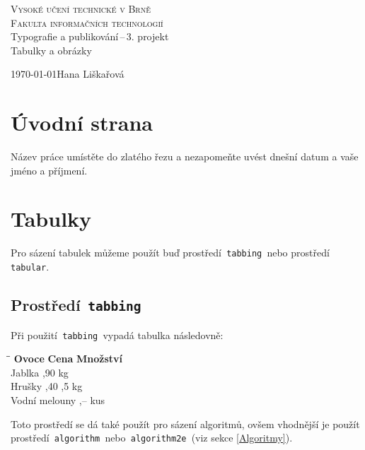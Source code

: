 \documentclass[a4paper, 11pt]{article}
\begin{document}
\begin{titlepage}
    \begin{center}
            \Huge{\textsc{Vysoké učení technické v Brně}}\\ %
            \huge{\textsc{Fakulta informačních technologií}}\\
        
        \LARGE{Typografie a publikování\,--\,3. projekt}\\
        \Huge{Tabulky a obrázky}
    \end{center}
    {\Large{\today \hfill Hana Liškařová}}
\end{titlepage}

\section{Úvodní strana}
    Název práce umístěte do zlatého řezu a nezapomeňte uvést dnešní datum a vaše jméno a příjmení.

\section{Tabulky}
    Pro sázení tabulek můžeme použít buď prostředí\texttt{ tabbing }nebo prostředí\texttt{ tabular}. %

    \subsection{Prostředí\texttt{ tabbing}}
        Při použití\texttt{ tabbing }vypadá tabulka následovně: %
        \begin{tabbing}
            \qquad\qquad\qquad\quad  \=   \qquad\qquad  \= \kill
            \textbf{Ovoce}\> \textbf{Cena}  \> \textbf{Množství}\\
            Jablka        ,90           kg\\
            Hrušky        ,40          ,5 kg\\
            Vodní melouny  ,--          kus\\
        \end{tabbing}

        \noindent Toto prostředí se dá také použít pro sázení algoritmů, ovšem vhodnější je použít prostředí\texttt{ algorithm }nebo\texttt{ algorithm2e }(viz sekce \ref{Algoritmy}).
\end{document}
